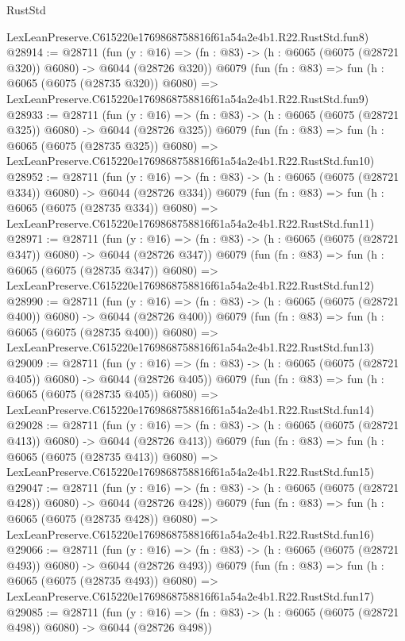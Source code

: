 \begin{lexlean}{RustStd}
\begin{coremodule}
    LexLeanPreserve.C615220e1769868758816f61a54a2e4b1.R22.RustStd.fun8)
@28914 := @28711
    (fun (y : @16) => (fn : @83) -> (h : @6065 (@6075 (@28721 @320)) @6080) -> @6044 (@28726 @320))
    @6079
    (fun (fn : @83) =>
    fun (h : @6065 (@6075 (@28735 @320)) @6080) =>
    LexLeanPreserve.C615220e1769868758816f61a54a2e4b1.R22.RustStd.fun9)
@28933 := @28711
    (fun (y : @16) => (fn : @83) -> (h : @6065 (@6075 (@28721 @325)) @6080) -> @6044 (@28726 @325))
    @6079
    (fun (fn : @83) =>
    fun (h : @6065 (@6075 (@28735 @325)) @6080) =>
    LexLeanPreserve.C615220e1769868758816f61a54a2e4b1.R22.RustStd.fun10)
@28952 := @28711
    (fun (y : @16) => (fn : @83) -> (h : @6065 (@6075 (@28721 @334)) @6080) -> @6044 (@28726 @334))
    @6079
    (fun (fn : @83) =>
    fun (h : @6065 (@6075 (@28735 @334)) @6080) =>
    LexLeanPreserve.C615220e1769868758816f61a54a2e4b1.R22.RustStd.fun11)
@28971 := @28711
    (fun (y : @16) => (fn : @83) -> (h : @6065 (@6075 (@28721 @347)) @6080) -> @6044 (@28726 @347))
    @6079
    (fun (fn : @83) =>
    fun (h : @6065 (@6075 (@28735 @347)) @6080) =>
    LexLeanPreserve.C615220e1769868758816f61a54a2e4b1.R22.RustStd.fun12)
@28990 := @28711
    (fun (y : @16) => (fn : @83) -> (h : @6065 (@6075 (@28721 @400)) @6080) -> @6044 (@28726 @400))
    @6079
    (fun (fn : @83) =>
    fun (h : @6065 (@6075 (@28735 @400)) @6080) =>
    LexLeanPreserve.C615220e1769868758816f61a54a2e4b1.R22.RustStd.fun13)
@29009 := @28711
    (fun (y : @16) => (fn : @83) -> (h : @6065 (@6075 (@28721 @405)) @6080) -> @6044 (@28726 @405))
    @6079
    (fun (fn : @83) =>
    fun (h : @6065 (@6075 (@28735 @405)) @6080) =>
    LexLeanPreserve.C615220e1769868758816f61a54a2e4b1.R22.RustStd.fun14)
@29028 := @28711
    (fun (y : @16) => (fn : @83) -> (h : @6065 (@6075 (@28721 @413)) @6080) -> @6044 (@28726 @413))
    @6079
    (fun (fn : @83) =>
    fun (h : @6065 (@6075 (@28735 @413)) @6080) =>
    LexLeanPreserve.C615220e1769868758816f61a54a2e4b1.R22.RustStd.fun15)
@29047 := @28711
    (fun (y : @16) => (fn : @83) -> (h : @6065 (@6075 (@28721 @428)) @6080) -> @6044 (@28726 @428))
    @6079
    (fun (fn : @83) =>
    fun (h : @6065 (@6075 (@28735 @428)) @6080) =>
    LexLeanPreserve.C615220e1769868758816f61a54a2e4b1.R22.RustStd.fun16)
@29066 := @28711
    (fun (y : @16) => (fn : @83) -> (h : @6065 (@6075 (@28721 @493)) @6080) -> @6044 (@28726 @493))
    @6079
    (fun (fn : @83) =>
    fun (h : @6065 (@6075 (@28735 @493)) @6080) =>
    LexLeanPreserve.C615220e1769868758816f61a54a2e4b1.R22.RustStd.fun17)
@29085 := @28711
    (fun (y : @16) => (fn : @83) -> (h : @6065 (@6075 (@28721 @498)) @6080) -> @6044 (@28726 @498))

\end{coremodule}
\end{lexlean}
